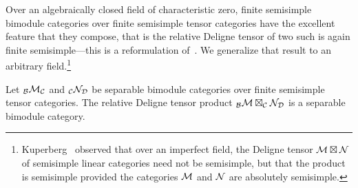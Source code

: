 \documentclass{amsart}
\begin{document}
Over an algebraically closed field of characteristic zero, finite semisimple bimodule categories over finite semisimple tensor categories have the excellent feature that they compose, that is the relative Deligne tensor of two such is again finite semisimple---this is a reformulation of~\cite[Theorem 2.16]{MR2183279}.  We generalize that result to an arbitrary field.\footnote{Kuperberg~\cite[\S 5]{MR1995781} observed that over an imperfect field, the Deligne tensor $\mathcal M \boxtimes \mathcal N$ of semisimple linear categories need not be semisimple, but that the product is semisimple provided the categories $\mathcal M$ and $\mathcal N$ are absolutely semisimple.}
\begin{theorem} \label{thm:compositeOfSep}
Let ${}_\mathcal B \mathcal M_\mathcal C$ and ${}_\mathcal C \mathcal N_\mathcal D$ be separable bimodule categories over finite semisimple tensor categories.  The relative Deligne tensor product ${}_{\mathcal B} \mathcal M \boxtimes_\mathcal C \mathcal N_\mathcal D$ is a separable bimodule category.
\end{theorem}
\end{document}
